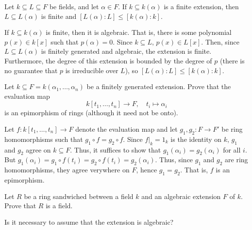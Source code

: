 \documentclass[../../master.tex]{subfiles}
\begin{document}
\begin{problem}
    Let $k \subseteq L \subseteq F$ be fields, and let $\alpha \in F$.
    If $k \subseteq k(\alpha)$ is a finite extension, then $L \subseteq L(\alpha)$ is finite and $[L(\alpha) : L] \leq [k(\alpha) : k]$.
\end{problem}

\begin{solution}
    If $k \subseteq k(\alpha)$ is finite, then it is algebraic.
    That is, there is some polynomial $p(x) \in k[x]$ such that $p(\alpha) = 0$.
    Since $k \subseteq L$, $p(x) \in L[x]$.
    Then, since $L \subseteq L(\alpha)$ is finitely generated and algebraic, the extension is finite.
    Furthermore, the degree of this extension is bounded by the degree of $p$ (there is no guarantee that $p$ is irreducible over $L$), so $[L(\alpha) : L] \leq [k(\alpha) : k]$.
\end{solution}

\begin{problem}
    Let $k \subseteq F = k(\alpha_1, \ldots, \alpha_n)$ be a finitely generated extension.
    Prove that the evaluation map
    \[
        k[t_1, \ldots, t_n] \to F, \quad t_i \mapsto \alpha_i
    \]
    is an epimorphism of rings (although it need not be onto).
\end{problem}

\begin{solution}
    Let $f: k[t_1, \ldots, t_n] \to F$ denote the evaluation map and let $g_1, g_2 : F \to F'$ be ring homomorphisms such that $g_1 \circ f = g_2 \circ f$.
    Since $f |_{k} = 1_{k}$ is the identity on $k$, $g_1$ and $g_2$ agree on $k \subseteq F$.
    Thus, it suffices to show that $g_1(\alpha_i) = g_2(\alpha_i)$ for all $i$.
    But $g_1(\alpha_i) = g_1 \circ f(t_i) = g_2 \circ f(t_i) = g_2 (\alpha_i)$.
    Thus, since $g_1$ and $g_2$ are ring homomorphisms, they agree verywhere on $F$, hence $g_1 = g_2$.
    That is, $f$ is an epimorphism.
\end{solution}

\begin{problem}
    Let $R$ be a ring sandwiched between a field $k$ and an algebraic extension $F$ of $k$.
    Prove that $R$ is a field.

    Is it necessary to assume that the extension is algebraic?
\end{problem}
\end{document}
